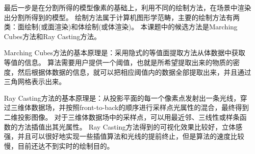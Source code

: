 最后一步是在分割所得的模型像素的基础上，利用不同的绘制方法，在场景中渲染出分割所得到的模型。
绘制方法属于计算机图形学范畴，主要的绘制方法有两类：面绘制(或面渲染)和体绘制(或体渲染)。
本课题中的候选方法是Marching Cubes方法和Ray Casting方法。

Marching Cubes方法的基本原理是：采用隐式的等值面提取方法从体数据中获取等值的信息。
算法需要用户提供一个阈值，也就是所希望提取出来的物质的密度，然后根据体数据的信息，就可以把相应阈值内的数据全部提取出来，并且通过三角网格表示出来。

Ray Casting方法的基本原理是：从投影平面的每一个像素点发射出一条光线，穿过三维体数据场，并按照front-to-back的顺序进行采样点光属性的混合，最终得到二维投影图像。
对于三维体数据场中的采样点，可以用最近邻、三线性或样条函数的方法插值出其光属性。
Ray Casting方法得到的可视化效果比较好，立体感强，并且可以很好地实现一些插值算法和光线的提前终止，但是算法的速度比较慢，目前还达不到实时的绘制目的。 